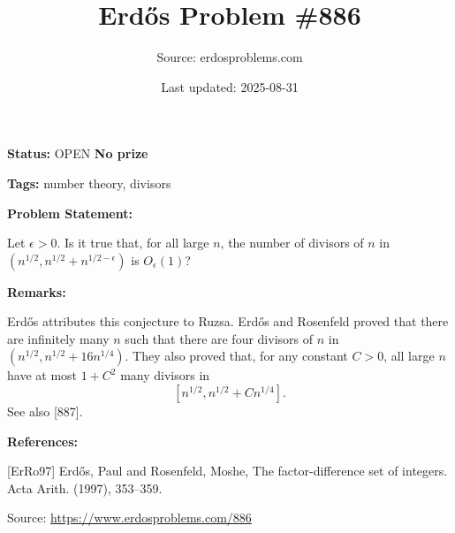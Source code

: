 \documentclass{article}
\title{Erd\H{o}s Problem \#886}
\date{Last updated: 2025-08-31}
\author{Source: erdosproblems.com}
\begin{document}
\maketitle

\noindent\textbf{Status:} OPEN \quad \textbf{No prize}

\noindent\textbf{Tags:} number theory, divisors

\medskip
\noindent\textbf{Problem Statement:}

Let $\epsilon>0$. Is it true that, for all large $n$, the number of divisors of $n$ in $(n^{1/2},n^{1/2}+n^{1/2-\epsilon})$ is $O_\epsilon(1)$?

\bigskip
\noindent\textbf{Remarks:}

Erd\H{o}s attributes this conjecture to Ruzsa. Erd\H{o}s and Rosenfeld \cite{ErRo97} proved that there are infinitely many $n$ such that there are four divisors of $n$ in $(n^{1/2},n^{1/2}+16n^{1/4})$. They also proved that, for any constant $C>0$, all large $n$ have at most $1+C^2$ many divisors in\[[n^{1/2}, n^{1/2}+Cn^{1/4}].\]See also [887].

\bigskip
\noindent\textbf{References:}

[ErRo97] Erd\H{o}s, Paul and Rosenfeld, Moshe, The factor-difference set of integers. Acta Arith. (1997), 353--359.

\bigskip
\noindent\small{Source: \url{https://www.erdosproblems.com/886}}
\end{document}
